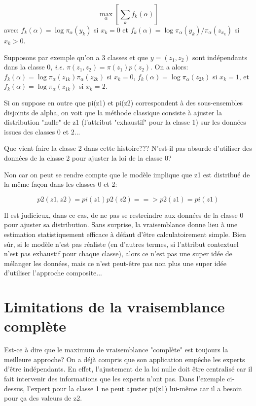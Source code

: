 \documentclass{article}
\begin{document}
$$
\max_\alpha \left[
\sum_k f_k(\alpha)
\right]
$$ 
avec: $ f_k(\alpha) = \log \pi_\alpha(y_k)$  si $x_k = 0$ et $f_k(\alpha) = \log \pi_\alpha(y_k)/\pi_\alpha(z_{x_k})$ si $x_k > 0$.

Supposons par exemple qu'on a 3 classes et que $y = (z_1, z_2)$ sont ind\'ependants dans la classe 0, {\em i.e.} $\pi(z_1, z_2) = \pi(z_1)p(z_2)$. On a alors: $f_k(\alpha) = \log \pi_\alpha(z_{1k})\pi_\alpha(z_{2k})$ si $x_k=0$, $f_k(\alpha) = \log \pi_\alpha(z_{2k})$ si $x_k=1$,  et $f_k(\alpha) = \log \pi_\alpha(z_{1k})$ si $x_k=2$.

Si on suppose en outre que pi(z1) et pi(z2) correspondent \`a des sous-ensembles disjoints de alpha, on voit que la m\'ethode classique consiste \`a ajuster la distribution "nulle" de z1 (l'attribut "exhaustif" pour la classe 1) sur les donn\'ees issues des classes 0 et 2... 

Que vient faire la classe 2 dans cette histoire??? N'est-il pas absurde d'utiliser des donn\'ees de la classe 2 pour ajuster la loi de la classe 0? 

Non car on peut se rendre compte que le mod\`ele implique que z1 est distribu\'e de la m\^eme fa\c{c}on dans les classes 0 et 2: 

$$p2(z1, z2) = pi(z1) p2(z2) ==> p2(z1) = pi(z1)$$ 

Il est judicieux, dans ce cas, de ne pas se restreindre aux donn\'ees de la classe 0 pour ajuster sa distribution. Sans surprise, la vraisemblance donne lieu \`a une estimation statistiquement efficace \`a d\'efaut d'\^etre calculatoirement simple. Bien s\^ur, si le mod\`ele n'est pas r\'ealiste (en d'autres termes, si l'attribut contextuel n'est pas exhaustif pour chaque classe), alors ce n'est pas une super id\'ee de m\'elanger les donn\'ees, mais ce n'est peut-\^etre pas non plus une super id\'ee d'utiliser l'approche composite... 


\section{Limitations de la vraisemblance compl\`ete}

Est-ce \`a dire que le maximum de vraisemblance "compl\`ete" est toujours la meilleure approche? On a d\'ej\`a compris que son application emp\^eche les experts d'\^etre ind\'ependants. En effet, l'ajustement de la loi nulle doit \^etre centralis\'e car il fait intervenir des informations que les experts n'ont pas. Dans l'exemple ci-dessus, l'expert pour la classe 1 ne peut ajuster pi(z1) lui-m\^eme car il a besoin pour \c{c}a des valeurs de z2. 
\end{document}
